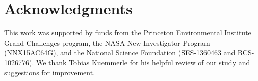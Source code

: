\documentclass[a4paper]{article}
\begin{document}







\section*{Acknowledgments}
This work was supported by funds from the Princeton Environmental Institute Grand Challenges program, the NASA New Investigator Program (NNX15AC64G), and the National Science Foundation (SES-1360463 and BCS-1026776). We thank Tobias Kuemmerle for his helpful review of our study and suggestions for improvement. 


 
{\footnotesize }

\end{document}
